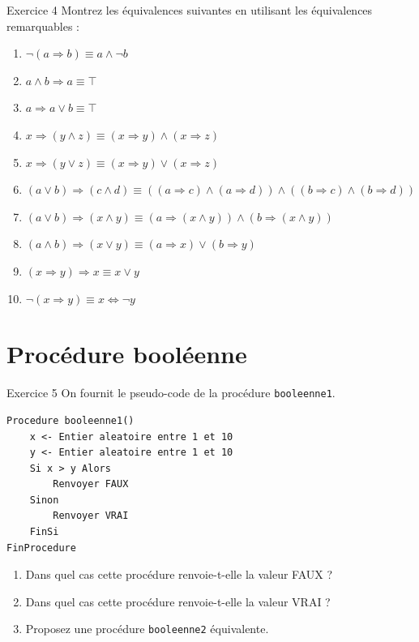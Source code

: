 \documentclass[a4paper,11pt]{article}
\begin{document}
\begin{exercisebox}{Exercice 4}
Montrez les équivalences suivantes en utilisant les équivalences remarquables :

\begin{enumerate}
    \item $\neg(a \Rightarrow b) \equiv a \wedge \neg b$
    \item $a \wedge b \Rightarrow a \equiv \top$
    \item $a \Rightarrow a \vee b \equiv \top$
    \item $x \Rightarrow (y \wedge z) \equiv (x \Rightarrow y) \wedge (x \Rightarrow z)$
    \item $x \Rightarrow (y \vee z) \equiv (x \Rightarrow y) \vee (x \Rightarrow z)$
    \item $(a \vee b) \Rightarrow (c \wedge d) \equiv ((a \Rightarrow c) \wedge (a \Rightarrow d)) \wedge ((b \Rightarrow c) \wedge (b \Rightarrow d))$
    \item $(a \vee b) \Rightarrow (x \wedge y) \equiv (a \Rightarrow (x \wedge y)) \wedge (b \Rightarrow (x \wedge y))$
    \item $(a \wedge b) \Rightarrow (x \vee y) \equiv (a \Rightarrow x) \vee (b \Rightarrow y)$
    \item $(x \Rightarrow y) \Rightarrow x \equiv x \vee y$
    \item $\neg(x \Rightarrow y) \equiv x \Leftrightarrow \neg y$
\end{enumerate}
\end{exercisebox}

\section{Procédure booléenne}

\begin{exercisebox}{Exercice 5}
On fournit le pseudo-code de la procédure \texttt{booleenne1}.

\begin{lstlisting}
Procedure booleenne1()
    x <- Entier aleatoire entre 1 et 10
    y <- Entier aleatoire entre 1 et 10
    Si x > y Alors
        Renvoyer FAUX
    Sinon
        Renvoyer VRAI
    FinSi
FinProcedure
\end{lstlisting}

\begin{enumerate}
    \item Dans quel cas cette procédure renvoie-t-elle la valeur FAUX ?
    \item Dans quel cas cette procédure renvoie-t-elle la valeur VRAI ?
    \item Proposez une procédure \texttt{booleenne2} équivalente.
\end{enumerate}
\end{exercisebox}
\end{document}
